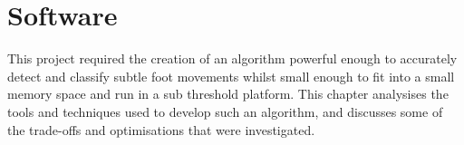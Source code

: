 \chapter{Software}

This project required the creation of an algorithm powerful enough to accurately detect and classify subtle foot movements whilst small enough to fit into a small memory space and run in a sub threshold platform. This chapter analysises the tools and techniques used to develop such an algorithm, and discusses some of the trade-offs and optimisations that were investigated.







